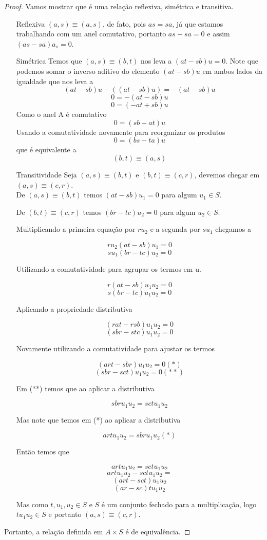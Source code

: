 \documentclass[10pt,a4paper]{article}
\begin{document}
\begin{proof} Vamos mostrar que é uma relação reflexiva, simétrica e transitiva.
	
	\begin{enumerate}
		\item [Reflexiva]  $(a,s) \equiv (a, s)$, de fato, pois $as=sa$, já que estamos trabalhando com um anel comutativo, portanto $as-sa=0$ e assim $(as-sa)a_s=0$.
		\item [Simétrica] Temos que $(a,s) \equiv (b, t)$ nos leva a $(at-sb)u=0$. Note que podemos somar o inverso aditivo do elemento $(at-sb)u$ em ambos lados da igualdade que nos leva a 
		$$(at-sb)u-((at-sb)u)=-(at-sb)u$$
		$$0=-(at-sb)u$$
		$$0=(-at+sb)u$$
		Como o anel A é comutativo
		$$0=(sb-at)u$$
		Usando a comutatividade novamente para reorganizar os produtos
		$$0=(bs-ta)u$$
		que é equivalente a 
		$$(b,t) \equiv (a, s)$$
		\item [Transitividade] Seja $(a,s) \equiv (b, t)$ e $(b,t) \equiv (c, r)$, devemos chegar em $(a,s) \equiv (c, r)$.
		\\
		
		De $(a,s) \equiv (b, t)$ temos $(at-sb)u_1=0$ para algum $u_1 \in S$.
		
		De $(b,t) \equiv (c, r)$ temos $(br-tc)u_2=0$ para algum $u_2 \in S$.
		
		Multiplicando a primeira equação por $ru_2$ e a segunda por $su_1$ chegamos a 
		
		$$ru_2(at-sb)u_1=0$$
		$$su_1(br-tc)u_2=0$$
		
		Utilizando a comutatividade para agrupar os termos em u.
		
		$$r(at-sb)u_1u_2=0$$
		$$s(br-tc)u_1u_2=0$$
		
		Aplicando a propriedade distributiva
		
		$$(rat-rsb)u_1u_2=0$$
		$$(sbr-stc)u_1u_2=0$$
		
		Novamente utilizando a comutatividade para ajustar os termos
		
		$$(art-sbr)u_1u_2=0 (*)$$
		$$(sbr-sct)u_1u_2=0 (**)$$
		
		Em (**) temos que ao aplicar a distributiva
		
		$$sbru_1u_2=sctu_1u_2$$
		
		Mas note que temos em (*) ao aplicar a distributiva 
		
		$$artu_1u_2=sbru_1u_2 (*)$$
		
		Então temos que 
		
		$$artu_1u_2=sctu_1u_2$$
		$$artu_1u_2-sctu_1u_2=$$
		$$(art-sct)u_1u_2$$
		$$(ar-sc)tu_1u_2$$
		
		Mas como $t, u_1, u_2 \in S$ e $S$ é um conjunto fechado para a multiplicação, logo $tu_1u_2 \in S$ e portanto $(a,s) \equiv (c, r)$.
		
	\end{enumerate}
	
	Portanto, a relação definida em $A \times S$ é de equivalência.
	
\end{proof}
\end{document}
